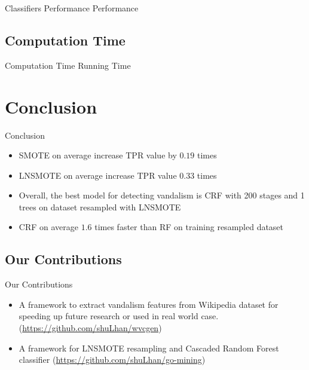 \documentclass{beamer}
\begin{document}
\begin{frame}
	{Classifiers Performance}
	{Performance}
	
\end{frame}

\subsection{Computation Time}

\begin{frame}
	{Computation Time}
	{Running Time}
	
\end{frame}


\section{Conclusion}

\begin{frame}
	\begin{multicols}{2}
		\tableofcontents[currentsection]
	\end{multicols}
\end{frame}

\begin{frame}
	{Conclusion}
	\begin{itemize}
		\item SMOTE on average increase TPR value by $0.19$ times
		\item LNSMOTE on average increase TPR value $0.33$ times
		\item Overall, the best model for detecting vandalism is CRF with 200
		stages and 1 trees on dataset resampled with LNSMOTE
		\item CRF on average $1.6$ times faster than RF on training resampled
		dataset
	\end{itemize}
\end{frame}

\subsection{Our Contributions}
\begin{frame}
	{Our Contributions}
	\begin{itemize}
		\item A framework to extract vandalism features from Wikipedia dataset
		for speeding up future research or used in real world case.
		(\url{https://github.com/shuLhan/wvcgen})
		\item A framework for LNSMOTE resampling and Cascaded Random Forest
		classifier
		(\url{https://github.com/shuLhan/go-mining})
	\end{itemize}
\end{frame}
\end{document}
